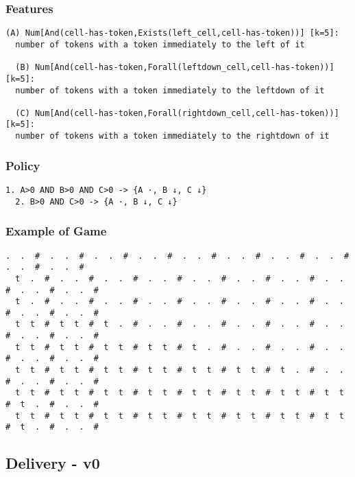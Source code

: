 \documentclass[a4paper]{article}
\begin{document}
\subsubsection{Features}
\begin{Verbatim}[fontsize=\footnotesize]
  (A) Num[And(cell-has-token,Exists(left_cell,cell-has-token))] [k=5]:
  number of tokens with a token immediately to the left of it

  (B) Num[And(cell-has-token,Forall(leftdown_cell,cell-has-token))] [k=5]:
  number of tokens with a token immediately to the leftdown of it

  (C) Num[And(cell-has-token,Forall(rightdown_cell,cell-has-token))] [k=5]:
  number of tokens with a token immediately to the rightdown of it

\end{Verbatim}

\subsubsection{Policy}
\begin{Verbatim}[fontsize=\footnotesize]
  1. A>0 AND B>0 AND C>0 -> {A ·, B ↓, C ↓}
  2. B>0 AND C>0 -> {A ·, B ↓, C ↓}

\end{Verbatim}

\subsubsection{Example of Game}
\begin{Verbatim}[fontsize=\footnotesize]
  .  .  #  .  .  #  .  .  #  .  .  #  .  .  #  .  .  #  .  .  #  .  .  #  .  .  #  .  .  #
  t  .  #  .  .  #  .  .  #  .  .  #  .  .  #  .  .  #  .  .  #  .  .  #  .  .  #  .  .  #
  t  .  #  .  .  #  .  .  #  .  .  #  .  .  #  .  .  #  .  .  #  .  .  #  .  .  #  .  .  #
  t  t  #  t  t  #  t  .  #  .  .  #  .  .  #  .  .  #  .  .  #  .  .  #  .  .  #  .  .  #
  t  t  #  t  t  #  t  t  #  t  t  #  t  .  #  .  .  #  .  .  #  .  .  #  .  .  #  .  .  #
  t  t  #  t  t  #  t  t  #  t  t  #  t  t  #  t  t  #  t  .  #  .  .  #  .  .  #  .  .  #
  t  t  #  t  t  #  t  t  #  t  t  #  t  t  #  t  t  #  t  t  #  t  t  #  t  .  #  .  .  #
  t  t  #  t  t  #  t  t  #  t  t  #  t  t  #  t  t  #  t  t  #  t  t  #  t  .  #  .  .  #
\end{Verbatim}


\subsection{Delivery - v0}
\end{document}
